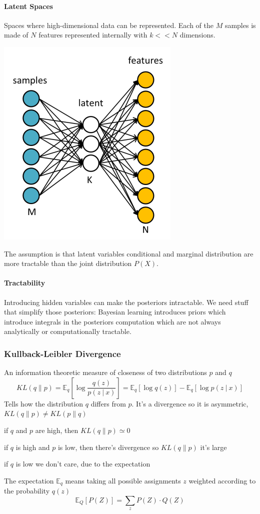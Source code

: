 \documentclass[10pt]{report}
\begin{document}
\paragraph{Latent Spaces} Spaces where high-dimensional data can be represented. Each of the $M$ samples is made of $N$ features represented internally with $k<<N$ dimensions.
\begin{center}
	\includegraphics[scale=0.5]{39.png}
\end{center}
The assumption is that latent variables conditional and marginal distribution are more tractable than the joint distribution $P(X)$.
\paragraph{Tractability} Introducing hidden variables can make the posteriors intractable. We need stuff that simplify those posteriors: Bayesian learning introduces priors which introduce integrals in the posteriors computation which are not always analytically or computationally tractable.
\subsubsection{Kullback-Leibler Divergence}
An information theoretic measure of closeness of two distributions $p$ and $q$ $$KL(q\|p) = \mathbb{E}_q\left[\log\frac{q(z)}{p(z\:|\:x)}\right] = \mathbb{E}_q[\log q(z)] - \mathbb{E}_q[\log p(z\:|\:x)]$$
Tells how the distribution $q$ differs from $p$. It's a divergence so it is asymmetric, $KL(q\|p) \neq KL(p\|q)$\begin{list}{}{}
	\item if $q$ and $p$ are high, then $KL(q\|p)\simeq 0$
	\item if $q$ is high and $p$ is low, then there's divergence so $KL(q\|p)$ it's large
	\item if $q$ is low we don't care, due to the expectation
\end{list}
The expectation $\mathbb{E}_q$ means taking all possible assignments $z$ weighted according to the probability $q(z)$
$$\mathbb{E}_Q[P(Z)] = \sum_z P(Z)\cdot Q(Z)$$
\end{document}

